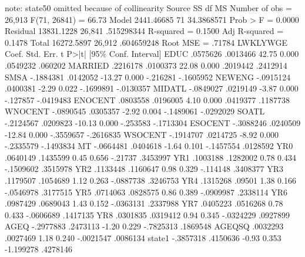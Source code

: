 note: state50 omitted because of collinearity
{\smallskip}
      Source {\VBAR}       SS           df       MS      Number of obs   =    26,913
   F(71, 26841)    =     66.73
       Model {\VBAR}  2441.46685        71  34.3868571   Prob > F        =    0.0000
    Residual {\VBAR}  13831.1228    26,841  .515298344   R-squared       =    0.1500
   Adj R-squared   =    0.1478
       Total {\VBAR}  16272.5897    26,912  .604659248   Root MSE        =    .71784
{\smallskip}
    LWKLYWGE {\VBAR}      Coef.   Std. Err.      t    P>|t|     [95\% Conf. Interval]
        EDUC {\VBAR}   .0575626   .0013466    42.75   0.000     .0549232     .060202
     MARRIED {\VBAR}   .2216178   .0100373    22.08   0.000     .2019442    .2412914
        SMSA {\VBAR}  -.1884381   .0142052   -13.27   0.000     -.216281   -.1605952
      NEWENG {\VBAR}  -.0915124   .0400381    -2.29   0.022    -.1699891   -.0130357
      MIDATL {\VBAR}  -.0849027   .0219149    -3.87   0.000     -.127857   -.0419483
     ENOCENT {\VBAR}   .0803558   .0196005     4.10   0.000     .0419377    .1187738
     WNOCENT {\VBAR}  -.0890545   .0305357    -2.92   0.004    -.1489061   -.0292029
       SOATL {\VBAR}  -.2124567   .0209823   -10.13   0.000     -.253583   -.1713304
     ESOCENT {\VBAR}  -.3088246   .0240509   -12.84   0.000    -.3559657   -.2616835
     WSOCENT {\VBAR}  -.1914707   .0214725    -8.92   0.000    -.2335579   -.1493834
          MT {\VBAR}  -.0664481   .0404618    -1.64   0.101    -.1457554    .0128592
         YR0 {\VBAR}   .0640149   .1435599     0.45   0.656      -.21737    .3453997
         YR1 {\VBAR}   .1003188   .1282002     0.78   0.434    -.1509602    .3515978
         YR2 {\VBAR}   .1133448   .1160647     0.98   0.329     -.114148    .3408377
         YR3 {\VBAR}   .1179507   .1054689     1.12   0.263    -.0887738    .3246753
         YR4 {\VBAR}   .1315268     .09501     1.38   0.166    -.0546978    .3177515
         YR5 {\VBAR}   .0714063   .0828575     0.86   0.389    -.0909987    .2338114
         YR6 {\VBAR}   .0987429   .0689043     1.43   0.152    -.0363131    .2337988
         YR7 {\VBAR}   .0405223   .0516268     0.78   0.433    -.0606689    .1417135
         YR8 {\VBAR}   .0301835   .0319412     0.94   0.345    -.0324229    .0927899
        AGEQ {\VBAR}  -.2977883   .2473113    -1.20   0.229    -.7825313    .1869548
      AGEQSQ {\VBAR}   .0032293   .0027469     1.18   0.240    -.0021547    .0086134
      state1 {\VBAR}  -.3857318   .4150636    -0.93   0.353    -1.199278    .4278146
